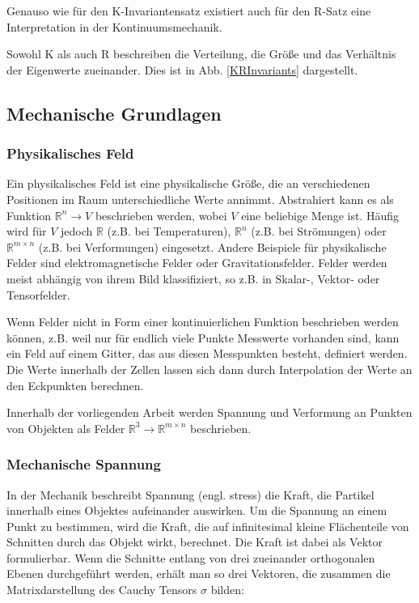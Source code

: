 \documentclass[a4paper,fontsize=12pt,toc=bib,halfparskip]{scrartcl}
\begin{document}
Genauso wie f\"ur den K-Invariantensatz existiert auch f\"ur den R-Satz eine Interpretation in der Kontinuumsmechanik. 

Sowohl K als auch R beschreiben die Verteilung, die Gr\"o{\ss}e und das Verh\"altnis der Eigenwerte zueinander. Dies ist in Abb. \ref{KRInvariants} dargestellt. 

\subsection{Mechanische Grundlagen}
\subsubsection{Physikalisches Feld}
Ein physikalisches Feld ist eine physikalische Gr\"o{\ss}e, die an verschiedenen Positionen im Raum unterschiedliche Werte annimmt\cite[1–2 Electric and magnetic fields]{feynman2011feynman}. Abstrahiert kann es als Funktion $\mathbb{R}^n \rightarrow V$ beschrieben werden, wobei $V$ eine beliebige Menge ist. H\"aufig wird f\"ur $V$ jedoch $\mathbb{R}$ (z.B. bei Temperaturen), $\mathbb{R}^n$ (z.B. bei Str\"omungen) oder $\mathbb{R}^{m\times n}$ (z.B. bei Verformungen) eingesetzt. Andere Beispiele f\"ur physikalische Felder sind elektromagnetische Felder oder Gravitationsfelder. Felder werden meist abh\"angig von ihrem Bild klassifiziert, so z.B. in Skalar-, Vektor- oder Tensorfelder.

Wenn Felder nicht in Form einer kontinuierlichen Funktion beschrieben werden k\"onnen, z.B. weil nur f\"ur endlich viele Punkte Messwerte vorhanden sind, kann ein Feld auf einem Gitter, das aus diesen Messpunkten besteht, definiert werden. Die Werte innerhalb der Zellen lassen sich dann durch Interpolation der Werte an den Eckpunkten berechnen.


Innerhalb der vorliegenden Arbeit werden Spannung und Verformung an Punkten von Objekten als Felder $\mathbb{R}^3 \rightarrow \mathbb{R}^{m\times n}$ beschrieben.


\subsubsection{Mechanische Spannung}
In der Mechanik beschreibt Spannung (engl. stress) die Kraft, die Partikel innerhalb eines Objektes aufeinander auswirken. Um die Spannung an einem Punkt zu bestimmen, wird die Kraft, die auf infinitesimal kleine Fl\"achenteile von Schnitten durch das Objekt wirkt, berechnet. Die Kraft ist dabei als Vektor formulierbar. Wenn die Schnitte entlang von drei zueinander orthogonalen Ebenen durchgef\"uhrt werden, erh\"alt man so drei Vektoren, die zusammen die Matrixdarstellung des Cauchy Tensors $\sigma$ bilden:
\end{document}
